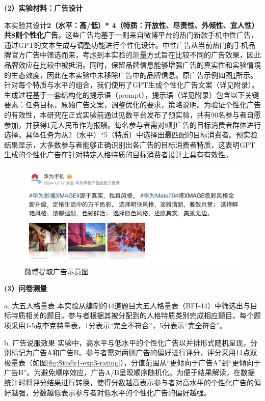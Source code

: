 \textbf{(2）实验材料：广告设计}

本实验共设计\textbf{2（水平：高/低）* 4（特质：开放性、尽责性、外倾性、宜人性）共8则个性化广告}。这些广告均基于一则来自微博平台的热门新款手机中性广告，通过GPT的文本生成与调整功能进行个性化设计。中性广告从当前热门的手机品牌官方广告中筛选而来，考虑到本实验的测量方式旨在比较不同的广告效果，因此品牌效应在比较中被抵消。同时，保留品牌信息能够增强广告的真实性和实验情境的生态效度，因此在本实验中未移除广告中的品牌信息。原广告示例如图\ref{fig:Study1-substudy3-originalAd}所示。针对每个特质与水平的组合，我们使用了GPT生成个性化广告文案（详见附录）。生成过程基于一套结构化的提示语（prompt），提示语（详见附录）包含以下关键要素：任务目标，原始广告文案，调整优化的要求，策略说明。为验证个性化广告的有效性，本研究在正式实验前通过见数平台发布了预实验，共有90名参与者自愿参加，并获得1元人民币作为报酬。每名参与者需对8则广告的目标消费者群体进行选择，具体任务为从2（水平）*5（特质）中选择出最匹配的目标消费者。预实验结果显示，大多数参与者能够正确识别出各广告的目标消费者特质，这表明GPT生成的个性化广告在针对特定人格特质的目标消费者设计上具有有效性。

\begin{figure}[H]
    \centering
    \includegraphics[width=.8\linewidth]{Image/Study1-exp3-original ad.png}
    \caption{\label{fig:Study1-substudy3-originalAd}微博提取广告示意图}
\end{figure}



\textbf{(3）问卷测量}
\label{study1-substudy3-measures}

a. 大五人格量表
本实验从\citet{john1991big}编制的44道题目大五人格量表（BFI-44）中筛选出与目标特质相关的题目。参与者根据其被分配到的人格特质类别完成相应题目。每个题项采用1-5点李克特量表，1分表示“完全不符合”，5分表示“完全符合”。

b. 广告说服效果
实验中，高水平与低水平的个性化广告以并排形式随机呈现，分别标记为广告A和广告B。参与者需对两则广告的偏好进行评分，评分采用11点双极量表（如图\ref{fig:Study1-exp3-rating}），分值范围从“更倾向于广告A”到“更倾向于广告B”。为避免顺序效应，广告A/B呈现顺序随机化。为便于结果解读，在数据统计时将评分结果进行转换，使得分数越高表示参与者对高水平的个性化广告的偏好越强，分数越低表示参与者对低水平的个性化广告的偏好越强。

